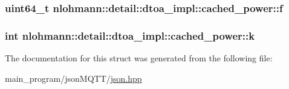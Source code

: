 \subsubsection[{\texorpdfstring{f}{f}}]{\setlength{\rightskip}{0pt plus 5cm}uint64\+\_\+t nlohmann\+::detail\+::dtoa\+\_\+impl\+::cached\+\_\+power\+::f}\hypertarget{structnlohmann_1_1detail_1_1dtoa__impl_1_1cached__power_a56a47ff88dce47986dd938f2ccb2abbf}{}\label{structnlohmann_1_1detail_1_1dtoa__impl_1_1cached__power_a56a47ff88dce47986dd938f2ccb2abbf}
\subsubsection[{\texorpdfstring{k}{k}}]{\setlength{\rightskip}{0pt plus 5cm}int nlohmann\+::detail\+::dtoa\+\_\+impl\+::cached\+\_\+power\+::k}\hypertarget{structnlohmann_1_1detail_1_1dtoa__impl_1_1cached__power_a8c1f2efed643eeaa8fae83c697a29c6a}{}\label{structnlohmann_1_1detail_1_1dtoa__impl_1_1cached__power_a8c1f2efed643eeaa8fae83c697a29c6a}


The documentation for this struct was generated from the following file\+:\begin{DoxyCompactItemize}
\item 
main\+\_\+program/json\+M\+Q\+T\+T/\hyperlink{json_8hpp}{json.\+hpp}\end{DoxyCompactItemize}
